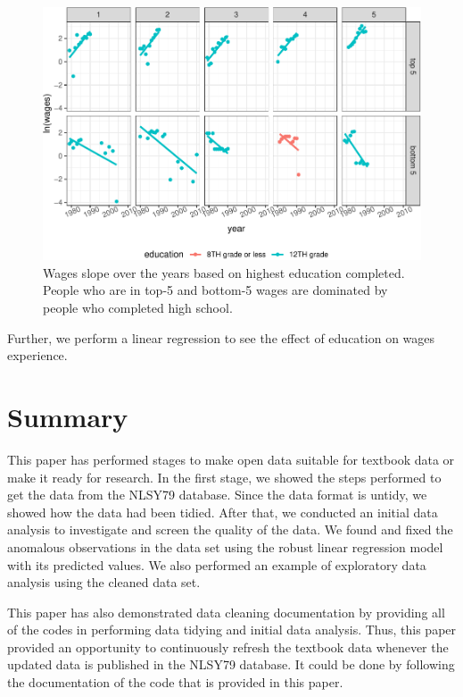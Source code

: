 \documentclass{article}
\begin{document}
\begin{figure}

{\centering \includegraphics[width=468px]{figures/slope-educ-1} 

}

\caption{Wages slope over the years based on highest education completed. People who are in top-5 and bottom-5 wages are dominated by people who completed high school.}\label{fig:slope-educ}
\end{figure}

Further, we perform a linear regression to see the effect of education on wages experience.

\hypertarget{summary}{%
\section{Summary}\label{summary}}

This paper has performed stages to make open data suitable for textbook data or make it ready for research. In the first stage, we showed the steps performed to get the data from the NLSY79 database. Since the data format is untidy, we showed how the data had been tidied. After that, we conducted an initial data analysis to investigate and screen the quality of the data. We found and fixed the anomalous observations in the data set using the robust linear regression model with its predicted values. We also performed an example of exploratory data analysis using the cleaned data set.

This paper has also demonstrated data cleaning documentation by providing all of the codes in performing data tidying and initial data analysis. Thus, this paper provided an opportunity to continuously refresh the textbook data whenever the updated data is published in the NLSY79 database. It could be done by following the documentation of the code that is provided in this paper.
\end{document}
